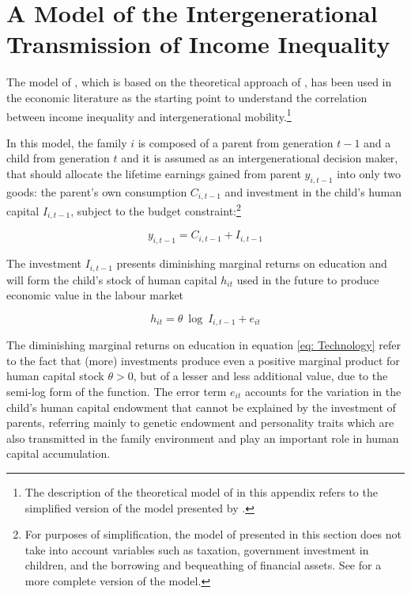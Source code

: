 \documentclass[a4paper, 12pt]{article}
\begin{document}
\newpage
\section{A Model of the Intergenerational Transmission of Income Inequality}
\label{appendix:Model-Solon}




The model of \citet{Solon2004}, which is based on the theoretical approach of \citet{Becker&Tomes1979, Becker&Tomes1986}, has been used in the economic literature as the starting point to understand the correlation between income inequality and intergenerational mobility.\footnote{The description of the theoretical model of \citet{Solon2004} in this appendix refers to the simplified version of the model presented by \citet{solon2014theoretical}.}

In this model, the family $i$ is composed of a parent from generation $t-1$ and a child from generation $t$ and it is assumed as an intergenerational decision maker, that should allocate the lifetime earnings gained from parent $y_{i,t-1}$ into only two goods: the parent’s own consumption $C_{i,t-1}$ and investment in the child’s human capital $I_{i,t-1}$, subject to the budget constraint:\footnote{For purposes of simplification, the model of \citet{Solon2004} presented in this section does not take into account variables such as taxation, government investment in children, and the borrowing and bequeathing of financial assets. See \citet{Becker&Tomes1986} for a more complete version of the model.}


\begin{equation} \label{eq:Budget}
y_{i,t-1}=C_{i,t-1}+I_{i,t-1}
\end{equation}

The investment $I_{i,t-1}$ presents diminishing marginal returns on education and will form the child’s stock of human capital $h_{it}$ used in the future to produce economic value in the labour market


\begin{equation} \label{eq: Technology}
h_{it}=\theta \ \log \ I_{i,t-1}+e_{it} 
\end{equation}


The diminishing marginal returns on education in equation \eqref{eq: Technology} refer to the fact that (more) investments produce even a positive marginal product for human capital stock $\theta > 0$, but of a lesser and less additional value, due to the semi-log form of the function. The error term $e_{it}$ accounts for the variation in the child’s human capital endowment that cannot be explained by the investment of parents, referring mainly to genetic endowment and personality traits which are also transmitted in the family environment and play an important role in human capital accumulation. 
\end{document}
